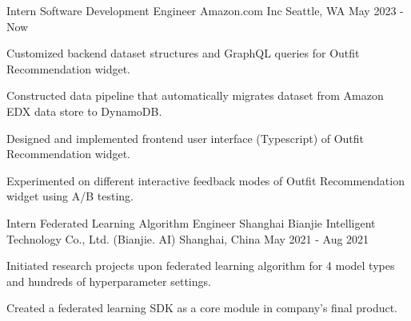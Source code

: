 

\begin{cventries}

  \cventry
    {Intern Software Development Engineer} %
    {Amazon.com Inc} %
    {Seattle, WA} %
    {May 2023 - Now} %
    {
      \begin{cvitems} %
        \item {Customized backend dataset structures and GraphQL queries for Outfit Recommendation widget.}
        \item {Constructed data pipeline that automatically migrates dataset from Amazon EDX data store to DynamoDB.}
        \item {Designed and implemented frontend user interface (Typescript) of Outfit Recommendation widget.}
        \item {Experimented on different interactive feedback modes of Outfit Recommendation widget using A/B testing.}
      \end{cvitems}
    }
  
  \cventry
    {Intern Federated Learning Algorithm Engineer} %
    {Shanghai Bianjie Intelligent Technology Co., Ltd. (Bianjie. AI)} %
    {Shanghai, China} %
    {May 2021 - Aug 2021} %
    {
      \begin{cvitems} %
        \item {Initiated research projects upon federated learning algorithm for 4 model types and hundreds of hyperparameter settings.}
        \item {Created a federated learning SDK as a core module in company's final product.}
      \end{cvitems}
    }

\end{cventries}
